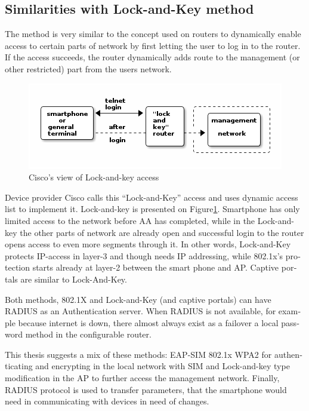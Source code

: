 \documentclass[12pt,a4paper,english]{tutthesis}
\begin{document}
\begin{otherlanguage}{english}
\section{Similarities with Lock-and-Key method}
\label{sec-4-4}
The method is very similar to the concept used on routers to dynamically enable
access to certain parts of network by first letting the user to log in
to the router. If the access succeeds, the router dynamically adds
route to the management (or other restricted) part from the 
users network.




\begin{figure}[htb]
\centering
\includegraphics[width=.9\linewidth]{lockandkey.png}
\caption{\label{fig:lock-and-view}Cisco's view of Lock-and-key access}
\end{figure}




Device provider Cisco calls this  ``Lock-and-Key''
access and uses dynamic access list to implement it\cite[p.117]{lockandkeybook}.
Lock-and-key is presented on Figure\ref{fig:lock-and-view}.
 Smartphone has only limited access to the network before AA
has completed, while in the Lock-and-key
the other parts of network are already open and successful login to the router opens
access to even more segments through it. In other words, Lock-and-Key
protects IP-access in layer-3 and though needs IP addressing, while
802.1x's protection starts already at layer-2 between the smart phone
and AP. Captive portals are similar to Lock-And-Key.


Both methods, 802.1X and Lock-and-Key (and captive portals) can have RADIUS as an Authentication server. 
When RADIUS is not available, for example because internet is down,
there almost always exist as a failover a local password method in the configurable 
router.








This thesis suggests a mix of these methods: EAP-SIM 802.1x WPA2 for
authenticating and encrypting in the local network with SIM and
Lock-and-key type modification in the AP to further access the 
management network. Finally, RADIUS protocol is used to transfer 
parameters, that the smartphone would need in communicating with 
devices in need of changes.


\end{otherlanguage}
\end{document}
